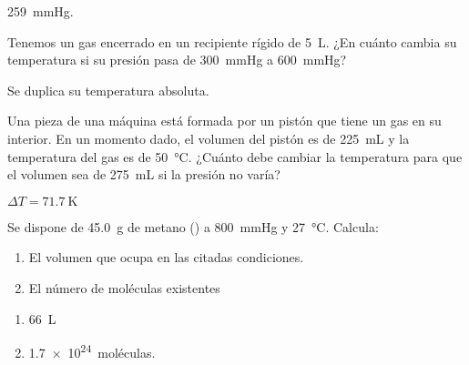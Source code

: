 \begin{solution}
  \SI{259}{\mmHg}.
\end{solution}



\begin{exercise}[
    tags    = {termodinámica, entalpía, entalpia de reacción, calor},
    topics  = {química, termoquímica, termodinámica},
    source  = {FQ 1B SAN 2015, p66, e39},
  ]
  Tenemos un gas encerrado en un recipiente rígido de \SI{5}{\liter}. ¿En cuánto cambia su temperatura si su presión pasa de \SI{300}{\mmHg} a \SI{600}{\mmHg}?
\end{exercise}

\begin{solution}
  Se duplica su temperatura absoluta.
\end{solution}




\begin{exercise}[
    tags    = {termodinámica, entalpía, entalpia de reacción, calor},
    topics  = {química, termoquímica, termodinámica},
    source  = {FQ 1B SAN 2015, p66, e39},
  ]
  Una pieza de una máquina está formada por un pistón que tiene un gas en su interior. En un momento dado, el volumen del pistón es de \SI{225}{\milli\liter} y la temperatura del gas es de \SI{50}{\celsius}. ¿Cuánto debe cambiar la temperatura para que el volumen sea de \SI{275}{\milli\liter} si la presión no varía?
\end{exercise}

\begin{solution}
  \( \Delta T = \SI{+71.7}{\kelvin} \)
\end{solution}




\begin{exercise}[
    tags    = {termodinámica, entalpía, entalpia de reacción, calor},
    topics  = {química, termoquímica, termodinámica},
    source  = {FQ 1B OXF 2015, p60, e22},
  ]
  Se dispone de \SI{45.0}{\gram} de metano () a \SI{800}{\mmHg} y \SI{27}{\celsius}. Calcula:
  \begin{enumerate}
    \item El volumen que ocupa en las citadas condiciones.
    \item El número de moléculas existentes
  \end{enumerate}
\end{exercise}

\begin{solution}
  \begin{enumerate}
    \item \SI{66}{\liter}
    \item \SI{1.7e24}{moléculas}.
  \end{enumerate}
\end{solution}




